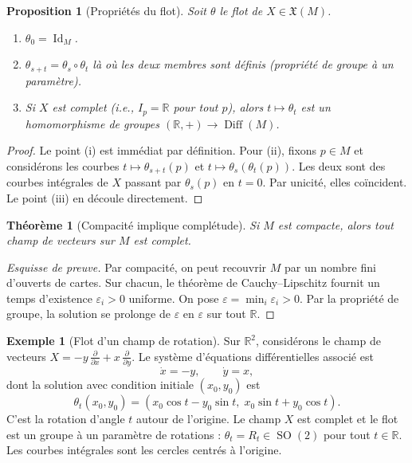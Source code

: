 \documentclass[12pt,a4paper,openany]{book}
\theoremstyle{definition}
\newtheorem{exemple}[definition]{Exemple}
\theoremstyle{plain}
\newtheorem{theoreme}[definition]{Théorème}
\newtheorem{proposition}[definition]{Proposition}
\theoremstyle{remark}
\newcommand{\R}{\mathbb{R}}
\DeclareMathOperator{\Id}{Id}
\DeclareMathOperator{\SO}{SO}
\DeclareMathOperator{\Diff}{Diff}
\begin{document}
\begin{proposition}[Propriétés du flot]\label{prop:proprietes-flot}
Soit $\theta$ le flot de $X \in \mathfrak{X}(M)$.
\begin{enumerate}[label=(\roman*)]
  \item $\theta_0 = \Id_M$.
  \item $\theta_{s+t} = \theta_s \circ \theta_t$ là où les deux membres sont définis
    (\emph{propriété de groupe à un paramètre}).
  \item Si $X$ est \emph{complet} (i.e., $I_p = \R$ pour tout $p$),
    alors $t \mapsto \theta_t$ est un homomorphisme de groupes $(\R, +) \to \Diff(M)$.
\end{enumerate}
\end{proposition}

\begin{proof}
Le point (i) est immédiat par définition. Pour (ii), fixons $p \in M$ et considérons
les courbes $t \mapsto \theta_{s+t}(p)$ et $t \mapsto \theta_s(\theta_t(p))$. Les deux sont
des courbes intégrales de $X$ passant par $\theta_s(p)$ en $t = 0$. Par unicité, elles
coïncident. Le point (iii) en découle directement.
\end{proof}

\begin{theoreme}[Compacité implique complétude]\label{thm:compact-complet}
Si $M$ est compacte, alors tout champ de vecteurs sur $M$ est complet.
\end{theoreme}

\begin{proof}[Esquisse de preuve]
Par compacité, on peut recouvrir $M$ par un nombre fini d'ouverts de cartes.
Sur chacun, le théorème de Cauchy--Lipschitz fournit un temps d'existence
$\varepsilon_i > 0$ uniforme. On pose $\varepsilon = \min_i \varepsilon_i > 0$.
Par la propriété de groupe, la solution se prolonge de $\varepsilon$ en $\varepsilon$
sur tout $\R$.
\end{proof}

\begin{exemple}[Flot d'un champ de rotation]\label{ex:flot-rotation}
Sur $\R^2$, considérons le champ de vecteurs $X = -y\,\frac{\partial}{\partial x}
+ x\,\frac{\partial}{\partial y}$. Le système d'équations différentielles associé est
\[
  \dot{x} = -y, \qquad \dot{y} = x,
\]
dont la solution avec condition initiale $(x_0, y_0)$ est
\[
  \theta_t(x_0, y_0) = (x_0\cos t - y_0\sin t,\; x_0\sin t + y_0\cos t).
\]
C'est la rotation d'angle $t$ autour de l'origine. Le champ $X$ est complet
et le flot est un groupe à un paramètre de rotations :
$\theta_t = R_t \in \SO(2)$ pour tout $t \in \R$.
Les courbes intégrales sont les cercles centrés à l'origine.
\end{exemple}
\end{document}
